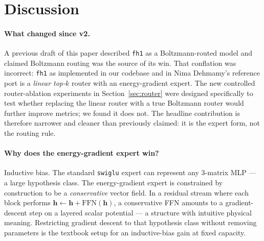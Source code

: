 \documentclass[oneside]{article}
\begin{document}
\section{Discussion}
\label{sec:discussion}

\paragraph{What changed since v2.}
A previous draft of this paper described \texttt{fh1} as a
Boltzmann-routed model and claimed Boltzmann routing was the source of
its win. That conflation was incorrect: \texttt{fh1} as implemented in
our codebase and in Nima Dehmamy's reference port is a
\emph{linear top-$k$} router with an energy-gradient expert. The new
controlled router-ablation experiments in Section~\ref{sec:router}
were designed specifically to test whether replacing the linear router
with a true Boltzmann router would further improve metrics; we found
it does not. The headline contribution is therefore narrower and
cleaner than previously claimed: it is the expert form, not the
routing rule.

\paragraph{Why does the energy-gradient expert win?}
Inductive bias. The standard \texttt{swiglu} expert can represent any
3-matrix MLP --- a large hypothesis class. The energy-gradient expert
is constrained by construction to be a \emph{conservative} vector
field. In a residual stream where each block performs
$\mathbf{h}\leftarrow \mathbf{h} + \mathrm{FFN}(\mathbf{h})$, a
conservative FFN amounts to a gradient-descent step on a layered
scalar potential --- a structure with intuitive physical meaning.
Restricting gradient descent to that hypothesis class without
removing parameters is the textbook setup for an inductive-bias gain
at fixed capacity.
\end{document}

